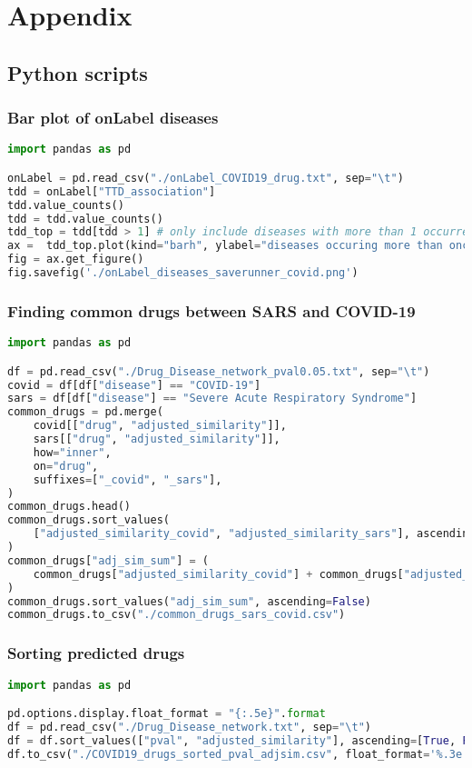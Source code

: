 \section{Appendix}
\label{sec:appendix}

\subsection{Python scripts}

\subsubsection{Bar plot of onLabel diseases}

\begin{lstlisting}[language=python]
import pandas as pd

onLabel = pd.read_csv("./onLabel_COVID19_drug.txt", sep="\t")
tdd = onLabel["TTD_association"]
tdd.value_counts()
tdd = tdd.value_counts()
tdd_top = tdd[tdd > 1] # only include diseases with more than 1 occurrence
ax =  tdd_top.plot(kind="barh", ylabel="diseases occuring more than once")
fig = ax.get_figure()
fig.savefig('./onLabel_diseases_saverunner_covid.png')
\end{lstlisting}

\subsubsection{Finding common drugs between SARS and COVID-19}

\begin{lstlisting}[language=python]
import pandas as pd

df = pd.read_csv("./Drug_Disease_network_pval0.05.txt", sep="\t")
covid = df[df["disease"] == "COVID-19"]
sars = df[df["disease"] == "Severe Acute Respiratory Syndrome"]
common_drugs = pd.merge(
    covid[["drug", "adjusted_similarity"]],
    sars[["drug", "adjusted_similarity"]],
    how="inner",
    on="drug",
    suffixes=["_covid", "_sars"],
)
common_drugs.head()
common_drugs.sort_values(
    ["adjusted_similarity_covid", "adjusted_similarity_sars"], ascending=[False, False]
)
common_drugs["adj_sim_sum"] = (
    common_drugs["adjusted_similarity_covid"] + common_drugs["adjusted_similarity_sars"]
)
common_drugs.sort_values("adj_sim_sum", ascending=False)
common_drugs.to_csv("./common_drugs_sars_covid.csv")
\end{lstlisting}

\subsubsection{Sorting predicted drugs}

\begin{lstlisting}[language=python]
import pandas as pd

pd.options.display.float_format = "{:.5e}".format
df = pd.read_csv("./Drug_Disease_network.txt", sep="\t")
df = df.sort_values(["pval", "adjusted_similarity"], ascending=[True, False])
df.to_csv("./COVID19_drugs_sorted_pval_adjsim.csv", float_format='%.3e')
\end{lstlisting}